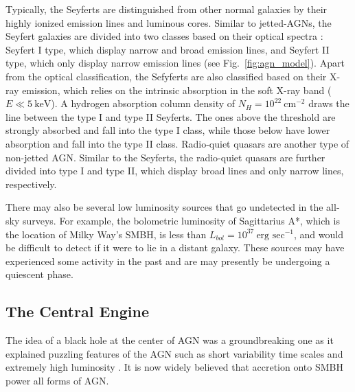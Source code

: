 Typically, the Seyferts are distinguished from other normal galaxies by their highly ionized emission lines and luminous cores. Similar to jetted-AGNs, the Seyfert galaxies are divided into two classes based on their optical spectra \citep{khachikian1974atlas}: Seyfert I type, which display narrow and broad emission lines, and Seyfert II type, which only display narrow emission lines (see Fig.~\ref{fig:agn_model}). Apart from the optical classification, the Sefyferts are also classified based on their X-ray emission, which relies on the intrinsic absorption in the soft X-ray band ($E\ll 5~\textrm{keV}$). A hydrogen absorption column density of $N_H=10^{22}~\textrm{cm}^{-2}$ draws the line between the type I and type II Seyferts. The ones above the threshold are strongly absorbed and fall into the type I class, while those below have lower absorption and fall into the type II class. Radio-quiet quasars are another type of non-jetted AGN. Similar to the Seyferts, the radio-quiet quasars are further divided into type I and type II, which display broad lines and only narrow lines, respectively.

There may also be several low luminosity sources that go undetected in the all-sky surveys. For example, the bolometric luminosity of Sagittarius A*, which is the location of Milky Way's SMBH, is less than $L_{bol}=10^{37}~\textrm{erg sec}^{-1}$, and would be difficult to detect if it were to lie in a distant galaxy. These sources may have experienced some activity in the past and are may presently be undergoing a quiescent phase.

\subsection{The Central Engine \label{sec:engine}}
The idea of a black hole at the center of AGN was a groundbreaking one as it explained puzzling features of the AGN such as short variability time scales and extremely high luminosity \citep{salpeter1964accretion,zel1964estimating,lynden1969galactic}. It is now widely believed that accretion onto SMBH power all forms of AGN. 


